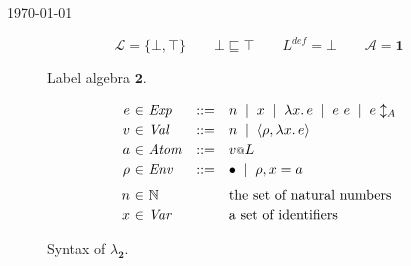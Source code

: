 \documentclass{article}
\makeatletter
\newcommand{\at}{\ensuremath{{\scriptstyle{@}}}}
\theoremstyle{definition}
\makeatother
\begin{document}
\begin{flushright}
  \today
\end{flushright}

\begin{figure}[h]
  \centering
  \[
  \mathcal{L} = \{ \bot, \top \}
  \qquad
  \bot \sqsubseteq \top
  \qquad
  L^{\mathit{def}} = \bot
  \qquad
  \mathcal{A} = \mathbf{1}
  \]
  \caption{Label algebra $\mathbf{2}$.}
  \label{fig:two}
\end{figure}

\begin{figure}[h]
  \centering
  \[
  \begin{array}[t]{r @{\ } c @{\ } l c l}
    e & \in & \mathit{Exp} & ::= &
    n\;\; |\;\;
    x\;\; |\;\;
    \lambda{x}.\, e\;\; |\;\;
    e\ e\;\; |\;\;
    e \updownarrow_{A} %
    \\[0.5ex]
    v & \in & \mathit{Val} & ::= &
    n\;\; |\;\;
    \langle{\rho, \lambda{x}.\, e\rangle}
    \\[0.5ex]
    a & \in & \mathit{Atom} & ::= &
    v \at L
    \\[0.5ex]
    \rho & \in & \mathit{Env} & ::= &
    \bullet\;\; |\;\;
    \rho, x = a
    \\[1.5ex]
    n & \in & \mathbb{N} & &
    \text{the set of natural numbers}
    \\[0.5ex]
    x & \in & \mathit{Var} & &
    \text{a set of identifiers}
  \end{array}
  \]
  \caption{Syntax of $\lambda_{\mathbf{2}}$.}
  \label{fig:syntax}
\end{figure}
\end{document}
